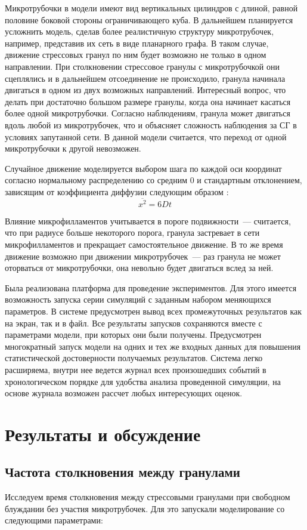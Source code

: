 \documentclass[14pt,a4paper]{extarticle}
\begin{document}
	Микротрубочки в модели имеют вид вертикальных цилиндров с длиной, равной половине боковой стороны ограничивающего куба. В дальнейшем планируется усложнить модель, сделав более реалистичную структуру микротрубочек, например, представив их сеть в виде планарного графа. В таком случае, движение стрессовых гранул по ним будет возможно не только в одном направлении. При столкновении стрессовое гранулы с микротрубочкой они сцеплялись и в дальнейшем отсоединение не происходило, гранула начинала двигаться в одном из двух возможных направлений. Интересный вопрос, что делать при достаточно большом размере гранулы, когда она начинает касаться более одной микротрубочки. Согласно наблюдениям, гранула может двигаться вдоль любой из микротрубочек, что и объясняет сложность наблюдения за СГ в условиях запутанной сети. В данной модели считается, что переход от одной микротрубочки к другой невозможен.
	
	Случайное движение моделируется выбором шага по каждой оси координат согласно нормальному распределению со средним 0 и стандартным отклонением, зависящим от коэффициента диффузии следующим образом \cite{Michalet:2010uq}:
$$
	\overline{x^2} = 6Dt
$$
	
	Влияние микрофилламентов учитывается в пороге подвижности~--- считается, что при радиусе больше некоторого порога, гранула застревает в сети микрофилламентов и прекращает самостоятельное движение. В то же время движение возможно при движении микротрубочек~--- раз гранула не может оторваться от микротрубочки, она невольно будет двигаться вслед за ней.

	Была реализована платформа для проведение экспериментов. Для этого имеется возможность запуска серии симуляций с заданным набором меняющихся параметров. В системе предусмотрен вывод всех промежуточных результатов как на экран, так и в файл. Все результаты запусков сохраняются вместе с параметрами модели, при которых они были получены. Предусмотрен многократный запуск модели на одних и тех же входных данных для повышения статистической достоверности получаемых результатов. Система легко расширяема, внутри нее ведется журнал всех произошедших событий в хронологическом порядке для удобства анализа проведенной симуляции, на основе журнала возможен рассчет любых интересующих оценок.


\section{Результаты и обсуждение}
\subsection{Частота столкновения между гранулами}
Исследуем время столкновения между стрессовыми гранулами при свободном блуждании без участия микротрубочек. Для это запускали моделирование со следующими параметрами:
\end{document}
